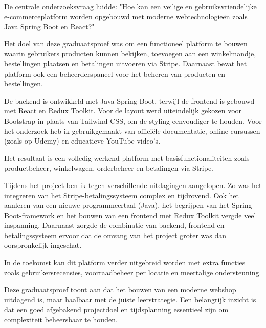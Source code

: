 De centrale onderzoeksvraag luidde: "Hoe kan een veilige en gebruiksvriendelijke e-commerceplatform worden opgebouwd met moderne webtechnologieën zoals Java Spring Boot en React?"

Het doel van deze graduaatsproef was om een functioneel platform te bouwen waarin gebruikers producten kunnen bekijken, toevoegen aan een winkelmandje, bestellingen plaatsen en betalingen uitvoeren via Stripe. Daarnaast bevat het platform ook een beheerderspaneel voor het beheren van producten en bestellingen.

De backend is ontwikkeld met Java Spring Boot, terwijl de frontend is gebouwd met React en Redux Toolkit. Voor de layout werd uiteindelijk gekozen voor Bootstrap in plaats van Tailwind CSS, om de styling eenvoudiger te houden. Voor het onderzoek heb ik gebruikgemaakt van officiële documentatie, online cursussen (zoals op Udemy) en educatieve YouTube-video’s.

Het resultaat is een volledig werkend platform met basisfunctionaliteiten zoals productbeheer, winkelwagen, orderbeheer en betalingen via Stripe. 

Tijdens het project ben ik tegen verschillende uitdagingen aangelopen. Zo was het integreren van het Stripe-betalingssysteem complex en tijdrovend. Ook het aanleren van een nieuwe programmeertaal (Java), het begrijpen van het Spring Boot-framework en het bouwen van een frontend met Redux Toolkit vergde veel inspanning. Daarnaast zorgde de combinatie van backend, frontend en betalingssysteem ervoor dat de omvang van het project groter was dan oorspronkelijk ingeschat.

In de toekomst kan dit platform verder uitgebreid worden met extra functies zoals gebruikersrecensies, voorraadbeheer per locatie en meertalige ondersteuning.

Deze graduaatsproef toont aan dat het bouwen van een moderne webshop uitdagend is, maar haalbaar met de juiste leerstrategie. Een belangrijk inzicht is dat een goed afgebakend projectdoel en tijdsplanning essentieel zijn om complexiteit beheersbaar te houden.